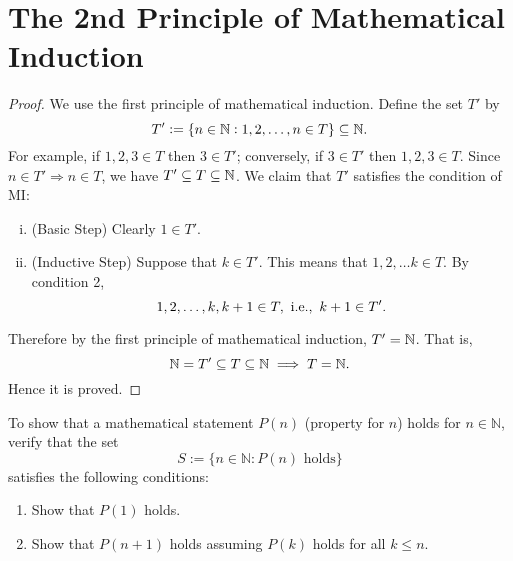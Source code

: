\documentclass[11pt,openany]{article}
\begin{document}
\section{The 2nd Principle of Mathematical Induction}
\begin{proof}
	We use the first principle of mathematical induction. Define the set $T'$ by \[
	T':=\set{n\in\mathbb{N}:1,2,\dots,n\in T}\subseteq\mathbb{N}.
	\] For example, if $1,2,3\in T$ then $3\in T'$; conversely, if $3\in T'$ then $1,2,3\in T$. Since $n\in T'\Rightarrow n\in T$, we have $T'\subseteq T\subseteq\mathbb{N}$. We claim that $T'$ satisfies the condition of MI: \begin{enumerate}[(i)]
		\item (Basic Step) Clearly $1\in T'$.
		\item (Inductive Step) Suppose that $k\in T'$. This means that $1,2,\dots k\in T$. By condition 2, \[
		1,2,\dots,k,k+1\in T,\ \ie,\ k+1\in T'.
		\]
	\end{enumerate}  
	Therefore by the first principle of mathematical induction, $T'=\mathbb{N}$. That is, \[
	\mathbb{N}=T'\subseteq T\subseteq\mathbb{N}\implies T=\mathbb{N}.
	\] Hence it is proved.
\end{proof}
\vfill
\begin{remark*}
	To show that a mathematical statement \( P(n) \) (property for \( n \)) holds for \( n \in \mathbb{N} \), verify that the set
	\[
	S := \{ n \in \mathbb{N} : P(n) \text{ holds} \}
	\]
	satisfies the following conditions:
	\begin{enumerate}
		\item Show that \( P(1) \) holds.
		\item Show that \( P(n+1) \) holds assuming \( P(k) \) holds for all \( k \leq n \).
	\end{enumerate}
\end{remark*}
\end{document}
